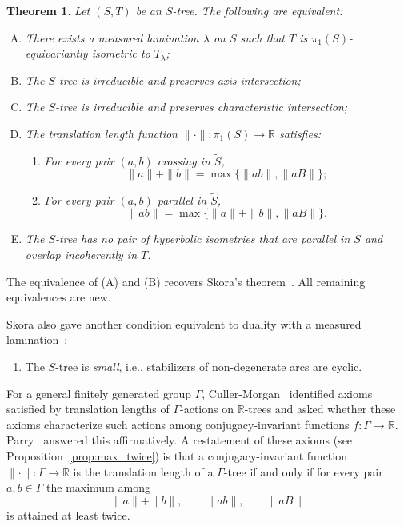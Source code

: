 \documentclass[11pt]{amsart}
\numberwithin{equation}{section}
\numberwithin{figure}{section}
\newtheorem{mainthm}{Theorem}
\theoremstyle{definition}
\theoremstyle{plain}
\newcommand*{\wt}[1]{\widetilde{#1}}
\begin{document}
\begin{mainthm}
Let $(S,T)$ be an $S$-tree. The following are equivalent:
\begin{enumerate}[(A)]
\item There exists a measured lamination $\lambda$ on $S$ such that
$T$ is $\pi_1(S)$-equivariantly isometric to $T_\lambda$;

\item The $S$-tree is irreducible and preserves axis intersection;

\item The $S$-tree is irreducible and preserves characteristic intersection;

\item The translation length function
$\|\cdot\|\colon \pi_1(S)\to\mathbb{R}$ satisfies:
\begin{enumerate}
\item For every pair $(a,b)$ crossing in $\wt{S}$,
\begin{equation}
\|a\|+\|b\|
=
\max\{\|ab\|,\|aB\|\};
\label{eq:small_disconn}
\end{equation}

\item For every pair $(a,b)$ parallel in $\wt{S}$,
\begin{equation}
\|ab\|
=
\max\{\|a\|+\|b\|,\|aB\|\}.
\label{eq:small_conn}
\end{equation}
\end{enumerate}

\item The $S$-tree has no pair of hyperbolic isometries that are
parallel in $\wt{S}$ and overlap incoherently in $T$.
\end{enumerate}
\label{mainthm:skora}
\end{mainthm}

The equivalence of {\rm (A)} and {\rm (B)} recovers
Skora’s theorem~\cite{Sko90:GeometricAction}.
All remaining equivalences are new.

Skora also gave another  condition
equivalent to duality with a measured lamination~\cite{Sk96:Splittings}:
\begin{enumerate}[label=(\Alph*), start=6]
\item The $S$-tree is \emph{small}, i.e., stabilizers of non-degenerate arcs are cyclic.
\end{enumerate}

For a general finitely generated group $\Gamma$,
Culler-Morgan~\cite{CM87:GroupActions} identified axioms satisfied by
translation lengths of $\Gamma$-actions on $\mathbb{R}$-trees and asked
whether these axioms characterize such actions among conjugacy-invariant
functions $f\colon\Gamma\to\mathbb{R}$. Parry~\cite{Par91:Translation}
answered this affirmatively.
A restatement of these axioms (see Proposition~\ref{prop:max_twice})
is that a conjugacy-invariant
function $\|\cdot\|\colon\Gamma\to\mathbb{R}$ is the translation length
of a $\Gamma$-tree if and only if for every pair $a,b\in\Gamma$ the
maximum among
\[
\|a\|+\|b\|, \qquad \|ab\|, \qquad \|aB\|
\]
is attained at least twice.
\end{document}

